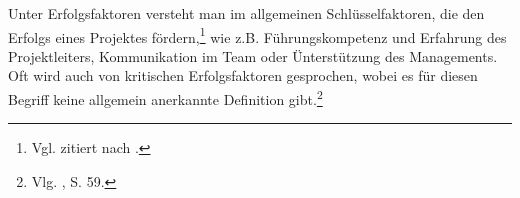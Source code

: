 Unter Erfolgsfaktoren versteht man im allgemeinen Schlüsselfaktoren, die den Erfolgs eines Projektes fördern,\footnote{Vgl. \cite{Buschermohle.2010} zitiert nach \cite{Basten.2012}.} wie
z.B. Führungskompetenz und Erfahrung des Projektleiters, Kommunikation im Team oder Ünterstützung des Managements.\\
Oft wird auch von kritischen Erfolgsfaktoren gesprochen, wobei es für diesen Begriff keine allgemein anerkannte Definition gibt.\footnote{Vlg. \cite{Basten.2012}, S. 59.}

